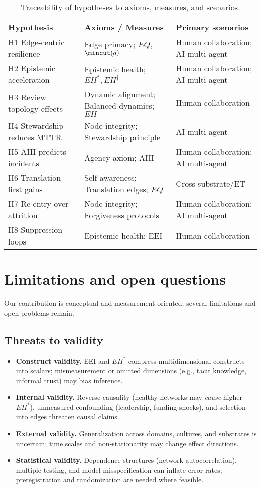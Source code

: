 \documentclass[12pt]{article}
\begin{document}
\begin{table}[htbp]
\centering
\small
\caption{Traceability of hypotheses to axioms, measures, and scenarios.}
\label{tab:traceability}
\begin{tabularx}{\linewidth}{lYY}
\toprule
\textbf{Hypothesis} & \textbf{Axioms / Measures} & \textbf{Primary scenarios} \\
\midrule
H1 Edge-centric resilience & Edge primacy; $EQ$, $\mincut(\bar q)$ & Human collaboration; AI multi-agent \\
H2 Epistemic acceleration & Epistemic health; $EH^{\ast}, EH^{\dagger}$ & Human collaboration; AI multi-agent \\
H3 Review topology effects & Dynamic alignment; Balanced dynamics; $EH$ & Human collaboration \\
H4 Stewardship reduces MTTR & Node integrity; Stewardship principle & AI multi-agent \\
H5 AHI predicts incidents & Agency axiom; AHI & Human collaboration; AI multi-agent \\
H6 Translation-first gains & Self-awareness; Translation edges; $EQ$ & Cross-substrate/ET \\
H7 Re-entry over attrition & Node integrity; Forgiveness protocols & Human collaboration; AI multi-agent \\
H8 Suppression loops & Epistemic health; EEI & Human collaboration \\
\bottomrule
\end{tabularx}
\end{table}

\section{Limitations and open questions}\label{sec:limitations}
Our contribution is conceptual and measurement-oriented; several limitations and open problems remain.

\subsection{Threats to validity}
\begin{itemize}[leftmargin=1.2em]
\item \textbf{Construct validity.} EEI and $EH^{\ast}$ compress multidimensional constructs into scalars; mismeasurement or omitted dimensions (e.g., tacit knowledge, informal trust) may bias inference.
\item \textbf{Internal validity.} Reverse causality (healthy networks may \emph{cause} higher $EH^{\ast}$), unmeasured confounding (leadership, funding shocks), and selection into edges threaten causal claims.
\item \textbf{External validity.} Generalization across domains, cultures, and substrates is uncertain; time scales and non-stationarity may change effect directions.
\item \textbf{Statistical validity.} Dependence structures (network autocorrelation), multiple testing, and model misspecification can inflate error rates; preregistration and randomization are needed where feasible.
\end{itemize}
\end{document}
